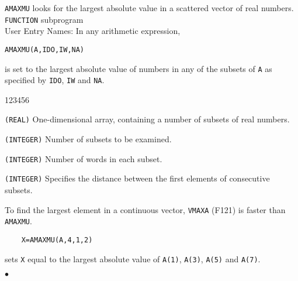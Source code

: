                          
                          
                   
{\tt AMAXMU} looks for the largest absolute value in a scattered
vector of real numbers.
\Structure
{\tt FUNCTION} subprogram  \\
User Entry Names: 
\Usage
In any arithmetic expression,
\begin{center}
{\tt AMAXMU(A,IDO,IW,NA)}
\end{center}
is set to the largest absolute value of numbers in any of the subsets of
{\tt A} as specified by {\tt IDO}, {\tt IW} and {\tt NA}.
\begin{DLtt}{123456}
\item[A] {\tt (REAL)} One-dimensional array, containing a number of
subsets of real numbers.
\item[IDO] {\tt (INTEGER)} Number of subsets to be examined.
\item[IW] {\tt (INTEGER)} Number of words in each subset.
\item[NA] {\tt (INTEGER)} Specifies the distance between the first
elements of consecutive subsets.
\end{DLtt}
\Notes
To find the largest element in a continuous vector, {\tt VMAXA} (F121)
is faster than {\tt AMAXMU}.
\Examples
\begin{verbatim}
    X=AMAXMU(A,4,1,2)
\end{verbatim}
sets {\tt X} equal to the largest absolute value of
{\tt A(1)}, {\tt A(3)}, {\tt A(5)} and {\tt A(7)}.
 
    $\bullet$
